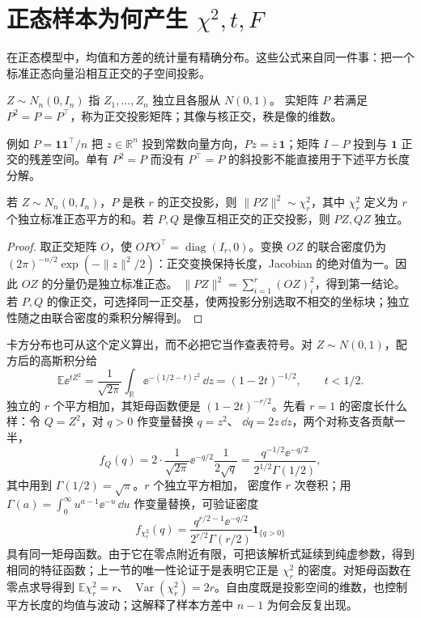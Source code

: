 \section{正态样本为何产生 \texorpdfstring{\(\chi^2,t,F\)}{chi-square, t, F}}

在正态模型中，均值和方差的统计量有精确分布。这些公式来自同一件事：把一个标准正态向量沿相互正交的子空间投影。

\begin{definition}[正态向量与正交投影]
\(Z\sim N_n(0,I_n)\) 指 \(Z_1,\ldots,Z_n\) 独立且各服从 \(N(0,1)\)。
实矩阵 \(P\) 若满足 \(P^2=P=P^\top\)，称为正交投影矩阵；其像与核正交，秩是像的维数。
\end{definition}

例如 \(P=\mathbf1\mathbf1^\top/n\) 把 \(z\in\mathbb R^n\) 投到常数向量方向，\(Pz=\overline z\,\mathbf1\)；矩阵 \(I-P\) 投到与 \(\mathbf1\) 正交的残差空间。单有 \(P^2=P\) 而没有 \(P^\top=P\) 的斜投影不能直接用于下述平方长度分解。

\begin{theorem}[高斯正交投影]
若 \(Z\sim N_n(0,I_n)\)，\(P\) 是秩 \(r\) 的正交投影，则
\(\|PZ\|^2\sim\chi_r^2\)，其中 \(\chi_r^2\) 定义为 \(r\) 个独立标准正态平方的和。若 \(P,Q\) 是像互相正交的正交投影，则 \(PZ,QZ\) 独立。
\end{theorem}
\begin{proof}
取正交矩阵 \(O\)，使 \(OPO^\top=\operatorname{diag}(I_r,0)\)。变换 \(OZ\) 的联合密度仍为
\((2\pi)^{-n/2}\exp(-\|z\|^2/2)\)：正交变换保持长度，Jacobian 的绝对值为一。因此 \(OZ\) 的分量仍是独立标准正态。
\(\|PZ\|^2=\sum_{i=1}^r(OZ)_i^2\)，得到第一结论。
若 \(P,Q\) 的像正交，可选择同一正交基，使两投影分别选取不相交的坐标块；独立性随之由联合密度的乘积分解得到。
\end{proof}

卡方分布也可从这个定义算出，而不必把它当作查表符号。对
\(Z\sim N(0,1)\)，配方后的高斯积分给
\[
\mathbb E\ee^{tZ^2}
=\frac1{\sqrt{2\pi}}\int_{\mathbb R}
\ee^{-(1/2-t)z^2}\,\dd z
=(1-2t)^{-1/2},\qquad t<1/2.
\]
独立的 \(r\) 个平方相加，其矩母函数便是
\((1-2t)^{-r/2}\)。先看 \(r=1\) 的密度长什么样：令
\(Q=Z^2\)，对 \(q>0\) 作变量替换 \(q=z^2\)、
\(\dd q=2z\,\dd z\)，两个对称支各贡献一半，
\[
f_{Q}(q)
=2\cdot\frac1{\sqrt{2\pi}}\ee^{-q/2}\frac1{2\sqrt q}
=\frac{q^{-1/2}\ee^{-q/2}}{2^{1/2}\Gamma(1/2)},
\]
其中用到 \(\Gamma(1/2)=\sqrt\pi\)。\(r\) 个独立平方相加，
密度作 \(r\) 次卷积；用
\(\Gamma(a)=\int_0^\infty u^{a-1}\ee^{-u}\,\dd u\)
作变量替换，可验证密度
\[
f_{\chi_r^2}(q)
=\frac{q^{r/2-1}\ee^{-q/2}}
{2^{r/2}\Gamma(r/2)}\mathbf1_{\{q>0\}}
\]
具有同一矩母函数。由于它在零点附近有限，可把该解析式延续到纯虚参数，得到相同的特征函数；上一节的唯一性论证于是表明它正是 \(\chi_r^2\) 的密度。对矩母函数在零点求导得到
\(\mathbb E\chi_r^2=r\)、
\(\operatorname{Var}(\chi_r^2)=2r\)。自由度既是投影空间的维数，也控制平方长度的均值与波动；这解释了样本方差中 \(n-1\) 为何会反复出现。

